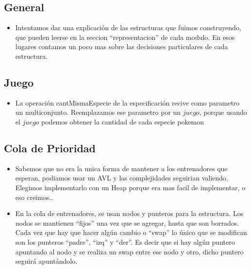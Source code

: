 
\subsection{General}

\begin{itemize}

\item{Intentamos dar una explicaci\'on de las estructuras que fuimos construyendo, que pueden leerse en la seccion ``representacion'' de cada modulo. En esos lugares contamos un poco mas sobre las decisiones particulares de cada estructura.}

\end{itemize}


\subsection{Juego}

\begin{itemize}
\item{La operaci\'on cantMismaEspecie de la especificaci\'on recive como parametro un multiconjunto. 
Reemplazamos ese parametro por un $juego$, porque usando el $juego$ podemos obtener la cantidad de cada especie pokemon}

\end{itemize}

\subsection{Cola de Prioridad}

\begin{itemize}

\item{Sabemos que no era la unica forma de mantener a los entrenadores que esperan, podiamos usar un AVL y las complejidades seguirian valiendo. Elegimos implementarlo con un Heap porque era mas facil de implementar, o eso creimos..}

\item{En la cola de entrenadores, se usan nodos y punteros para la estructura. Los nodos se mantienen ``fijos'' una vez que se agregar, hasta que son borrados. Cada vez que hay que hacer alg\'un cambio o ``swap'' lo \'unico que se modifican son los punteros ``padre'', ``izq'' y ``der''. Es decir que si hay alg\'un puntero apuntando al nodo y se realiza un swap entre ese nodo y otro, dicho puntero seguir\'a apunt\'andolo.}

\end{itemize}


